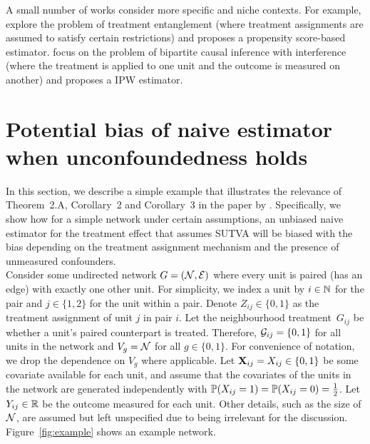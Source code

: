 \documentclass[10pt]{article}
\begin{document}
A small number of works consider more specific and niche contexts. For example, \textcite{Toulis:2018} explore the problem of treatment entanglement (where treatment assignments are assumed to satisfy certain restrictions) and proposes a propensity score-based estimator. \textcite{Zigler:2021} focus on the problem of bipartite causal inference with interference (where the treatment is applied to one unit and the outcome is measured on another) and proposes a IPW estimator.


\section{Potential bias of naive estimator when unconfoundedness holds}\label{sec:example}

In this section, we describe a simple example that illustrates the relevance of Theorem~2.A, Corollary~2 and Corollary~3 in the paper by \textcite{Forastiere:2021}. Specifically, we show how for a simple network under certain assumptions, an unbiased naive estimator for the treatment effect that assumes SUTVA will be biased with the bias depending on the treatment assignment mechanism and the presence of unmeasured confounders.
\\

Consider some undirected network $G=(\calN,\calE)$ where every unit is paired (has an edge) with exactly one other unit. For simplicity, we index a unit by $i\in\bbN$ for the pair and $j\in\{1,2\}$ for the unit within a pair. Denote $Z_{ij}\in\{0,1\}$ as the treatment assignment of unit $j$ in pair $i$. Let the neighbourhood treatment~$G_{ij}$ be whether a unit's paired counterpart is treated. Therefore, $\calG_{ij}=\{0,1\}$ for all units in the network and $V_g=\calN$ for all $g\in\{0,1\}$. For convenience of notation, we drop the dependence on $V_g$ where applicable. Let $\bfX_{ij}=X_{ij}\in\{0,1\}$ be some covariate available for each unit, and assume that the covariates of the units in the network are generated independently with $\P(X_{ij}=1)=\P(X_{ij}=0)=\frac{1}{2}$. Let $Y_{ij}\in\bbR$ be the outcome measured for each unit. Other details, such as the size of $\calN$, are assumed but left unspecified due to being irrelevant for the discussion. Figure~\ref{fig:example} shows an example network.
\\
\end{document}
